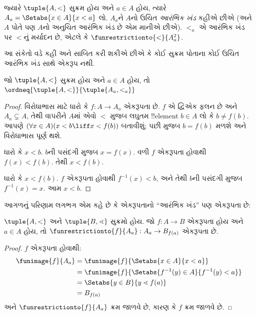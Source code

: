 \documentclass[../../../include/open-logic-section]{subfiles}
\begin{document}
\begin{defn}
જ્યારે $\tuple{A, <}$ સુક્રમ હોય અને $a \in A$ હોય, ત્યારે
$A_a = \Setabs{x \in A}{x
< a}$ લો. $A_a$ને $A$નો ઉચિત \emph{આરંભિક ખંડ} કહીએ
છીએ (અને $A$ પોતે પણ $A$નો અનુચિત આરંભિક ખંડ છે એમ માનીએ છીએ).
$<_a$ એ આરંભિક ખંડ પર $<$નું મર્યાદન છે, એટલે કે
$\funrestrictionto{\mathord{<}}{A_a^2}$.
\end{defn}
\noindent
આ સંકેતો વડે કહી અને સાબિત કરી શકીએ છીએ કે કોઈ સુક્રમ
પોતાના કોઈ ઉચિત આરંભિક ખંડ સાથે એકરૂપ નથી.

\begin{lem}
જો $\tuple{A, <}$ સુક્રમ હોય અને $a \in A$ હોય, તો
$\ordneq{\tuple{A, <}}{\tuple{A_a, <_a}}$
\end{lem}

\begin{proof}
વિરોધાભાસ માટે ધારો કે $f \colon A \to A_a$ એકરૂપતા
છે. $f$ એ દ્વિએક ફલન છે અને $A_a \subsetneq A$,
તેથી  વાપરીને
$A$માં એવો $<$ મુજબ લઘુતમ !!{element} $b \in A$ લો
કે $b \neq f(b)$. આપણે
$(\forall x \in A)(x<b \liff x < f(b))$ બતાવીશું;
પછી
મુજબ $b =
f(b)$ મળશે અને વિરોધાભાસ પૂર્ણ થશે.

ધારો કે $x < b$. $b$ની પસંદગી મુજબ $x = f(x)$.
વળી $f$ એકરૂપતા હોવાથી $f(x) <
f(b)$. તેથી $x < f(b)$.

ધારો કે $x < f(b)$. $f$ એકરૂપતા હોવાથી
$f^{-1}(x) < b$, અને તેથી $b$ની પસંદગી મુજબ
$f^{-1}(x) = x$. આમ $x < b$.
\end{proof}

આગળનું પરિણામ લગભગ એમ કહે છે કે એકરૂપતાનો
“આરંભિક ખંડ” પણ એકરૂપતા છે:

\begin{lem}
$\tuple{A, <}$ અને $\tuple{B, \lessdot}$ સુક્રમો હોય.
જો $f
\colon A \to B$ એકરૂપતા હોય અને $a \in A$ હોય,
તો $\funrestrictionto{f}{A_{a}} : A_a \to B_{f(a)}$
એકરૂપતા છે.
\end{lem}

\begin{proof}
$f$ એકરૂપતા હોવાથી:
\begin{align*}
	\funimage{f}{A_a} &= \funimage{f}{\Setabs{x \in A}{x < a}}\\
	&= \funimage{f}{\Setabs{f^{-1}(y) \in A}{f^{-1}(y) < a}} \\
	&= \Setabs{y \in B}{y \lessdot f(a)} \\
	&=B_{f(a)} 
\end{align*}
અને $\funrestrictionto{f}{A_a}$ ક્રમ જાળવે છે,
કારણ કે $f$ ક્રમ જાળવે છે.
\end{proof}
\end{document}
